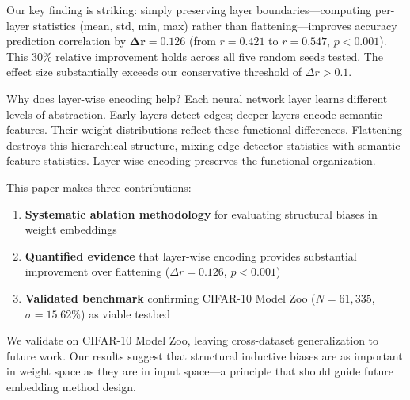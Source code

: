 Our key finding is striking: simply preserving layer boundaries---computing per-layer statistics (mean, std, min, max) rather than flattening---improves accuracy prediction correlation by $\mathbf{\Delta r = 0.126}$ (from $r = 0.421$ to $r = 0.547$, $p < 0.001$). This 30\% relative improvement holds across all five random seeds tested. The effect size substantially exceeds our conservative threshold of $\Delta r > 0.1$.

Why does layer-wise encoding help? Each neural network layer learns different levels of abstraction. Early layers detect edges; deeper layers encode semantic features. Their weight distributions reflect these functional differences. Flattening destroys this hierarchical structure, mixing edge-detector statistics with semantic-feature statistics. Layer-wise encoding preserves the functional organization.

This paper makes three contributions:

\begin{enumerate}
    \item \textbf{Systematic ablation methodology} for evaluating structural biases in weight embeddings
    \item \textbf{Quantified evidence} that layer-wise encoding provides substantial improvement over flattening ($\Delta r = 0.126$, $p < 0.001$)
    \item \textbf{Validated benchmark} confirming CIFAR-10 Model Zoo ($N = 61{,}335$, $\sigma = 15.62\%$) as viable testbed
\end{enumerate}

We validate on CIFAR-10 Model Zoo, leaving cross-dataset generalization to future work. Our results suggest that structural inductive biases are as important in weight space as they are in input space---a principle that should guide future embedding method design.
